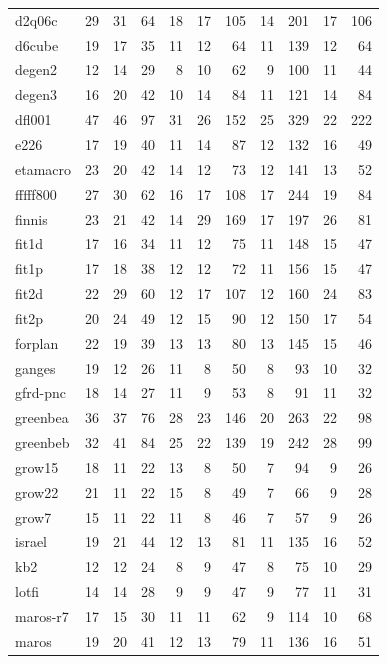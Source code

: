 \begin{small}
\begin{longtable}{|l|r|rr||r|rr||rr||rr|}
d2q06c & 29 & 31 & 64  & 18 & 17 & 105 & 14 & 201 & 17 & 106 \\
d6cube & 19 & 17 & 35  & 11 & 12 & 64 & 11 & 139 & 12 & 64 \\
degen2 & 12 & 14 & 29  & 8 & 10 & 62 & 9 & 100 & 11 & 44 \\
degen3 & 16 & 20 & 42  & 10 & 14 & 84 & 11 & 121 & 14 & 84 \\
df{l}001 & 47 & 46 & 97 & 31 & 26 & 152 & 25 & 329 & 22 & 222 \\
e226 & 17 & 19 & 40  & 11 & 14 & 87 & 12 & 132 & 16 & 49 \\
etamacro & 23 & 20 & 42  & 14 & 12 & 73 & 12 & 141 & 13 & 52 \\
{f}f{f}f{f}800 & 27 & 30 & 62  & 16 & 17 & 108 & 17 & 244 & 19 & 84 \\
finnis & 23 & 21 & 42  & 14 & 29 & 169 & 17 & 197 & 26 & 81 \\
fit1d & 17 & 16 & 34  & 11 & 12 & 75 & 11 & 148 & 15 & 47 \\
fit1p & 17 & 18 & 38  & 12 & 12 & 72 & 11 & 156 & 15 & 47 \\
fit2d & 22 & 29 & 60  & 12 & 17 & 107 & 12 & 160 & 24 & 83 \\
fit2p & 20 & 24 & 49  & 12 & 15 & 90 & 12 & 150 & 17 & 54 \\
forplan & 22 & 19 & 39  & 13 & 13 & 80 & 13 & 145 & 15 & 46 \\
ganges & 19 & 12 & 26  & 11 & 8 & 50 & 8 & 93 & 10 & 32 \\
gfrd-pnc & 18 & 14 & 27  & 11 & 9 & 53 & 8 & 91 & 11 & 32 \\
greenbea & 36 & 37 & 76  & 28 & 23 & 146 & 20 & 263 & 22 & 98 \\
greenbeb & 32 & 41 & 84 & 25 & 22 & 139 & 19 & 242 & 28 & 99 \\
grow15 & 18 & 11 & 22  & 13 & 8 & 50 & 7 & 94 & 9 & 26 \\
grow22 & 21 & 11 & 22  & 15 & 8 & 49 & 7 & 66 & 9 & 28 \\
grow7 & 15 & 11 & 22  & 11 & 8 & 46 & 7 & 57 & 9 & 26 \\
israel & 19 & 21 & 44  & 12 & 13 & 81 & 11 & 135 & 16 & 52 \\
kb2 & 12 & 12 & 24  & 8 & 9 & 47 & 8 & 75 & 10 & 29 \\
lotfi & 14 & 14 & 28  & 9 & 9 & 47 & 9 & 77 & 11 & 31 \\
maros-r7 & 17 & 15 & 30  & 11 & 11 & 62 & 9 & 114 & 10 & 68 \\
maros & 19 & 20 & 41 & 12 & 13 & 79 & 11 & 136 & 16 & 51 \\

\end{longtable}
\end{small}
